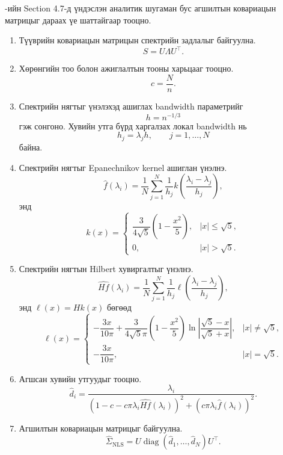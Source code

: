 \citet{ledoitwolf2020}-ийн Section 4.7-д
үндэслэн аналитик шугаман бус агшилтын
ковариацын матрицыг дараах үе шаттайгаар
тооцно.

\begin{enumerate}
	
	
	\item Түүврийн ковариацын матрицын
	спектрийн задлалыг байгуулна.
	\[
	S=U\Lambda U^{\top}.
	\]
	
	\item Хөрөнгийн тоо болон ажиглалтын
	тооны харьцааг тооцно.
	\[
	c=\frac{N}{n}.
	\]
	
	\item Спектрийн нягтыг үнэлэхэд
	ашиглах bandwidth параметрийг
	\[
	h=n^{-1/3}
	\]
	гэж сонгоно. Хувийн утга бүрд
	харгалзах локал bandwidth нь
	\[
	h_j=\lambda_jh,
	\qquad j=1,\ldots,N
	\]
	байна.
	
	\item Спектрийн нягтыг Epanechnikov
	kernel ашиглан үнэлнэ.
	\[
	\widehat{f}(\lambda_i)
	=
	\frac{1}{N}
	\sum_{j=1}^{N}
	\frac{1}{h_j}
	k\left(
	\frac{\lambda_i-\lambda_j}{h_j}
	\right),
	\]
	энд
	\[
	k(x)
	=
	\begin{cases}
		\dfrac{3}{4\sqrt{5}}
		\left(1-\dfrac{x^2}{5}\right),
		& |x|\leq\sqrt{5},\\[0.5em]
		0,
		& |x|>\sqrt{5}.
	\end{cases}
	\]
	
	\item Спектрийн нягтын Hilbert
	хувиргалтыг үнэлнэ.
	\[
	\widehat{Hf}(\lambda_i)
	=
	\frac{1}{N}
	\sum_{j=1}^{N}
	\frac{1}{h_j}
	\ell\left(
	\frac{\lambda_i-\lambda_j}{h_j}
	\right),
	\]
	энд $\ell(x)=Hk(x)$ бөгөөд
	\[
	\ell(x)
	=
	\begin{cases}
		-\dfrac{3x}{10\pi}
		+
		\dfrac{3}{4\sqrt{5}\pi}
		\left(1-\dfrac{x^2}{5}\right)
		\ln\left|
		\dfrac{\sqrt{5}-x}{\sqrt{5}+x}
		\right|,
		& |x|\neq\sqrt{5},\\[1em]
		-\dfrac{3x}{10\pi},
		& |x|=\sqrt{5}.
	\end{cases}
	\]
	
	\item Агшсан хувийн утгуудыг
	тооцно.
	\[
	\widehat{d}_i
	=
	\frac{\lambda_i}
	{
		\left(
		1-c-c\pi\lambda_i
		\widehat{Hf}(\lambda_i)
		\right)^2
		+
		\left(
		c\pi\lambda_i
		\widehat{f}(\lambda_i)
		\right)^2
	}.
	\]
	
	\item Агшилтын ковариацын матрицыг
	байгуулна.
	\[
	\widehat{\Sigma}_{\mathrm{NLS}}
	=
	U
	\operatorname{diag}
	(\widehat{d}_1,\ldots,\widehat{d}_N)
	U^{\top}.
	\]
	
\end{enumerate}



